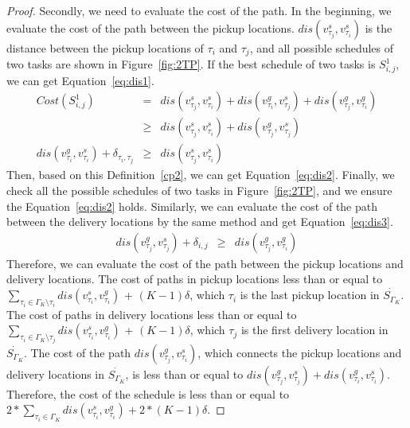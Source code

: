 \documentclass[sigconf,anonymous]{aamas}
\begin{document}
\begin{proof}
    Secondly, we need to evaluate the cost of the path.
    In the beginning, we evaluate the cost of the path between the pickup locations.
    $dis(v^{s}_{\tau_{j}}, v^{s}_{\tau_{i}})$ is the distance 
    between the pickup locations of $\tau_{i}$ and $\tau_{j}$,
    and all possible schedules of two tasks are shown in Figure~\ref{fig:2TP}.
    If the best schedule of two tasks is $S^{1}_{i,j}$,
    we can get Equation~\ref{eq:dis1}.
    \begin{eqnarray}
      \label{eq:dis1}
      Cost(S^{1}_{i,j}) &=& dis(v^s_{\tau_j}, v^s_{\tau_i})+dis(v^g_{\tau_i}, v^s_{\tau_j})
      +dis(v^g_{\tau_j}, v^g_{\tau_i}) \nonumber \\
      & \geq & dis(v^s_{\tau_j}, v^s_{\tau_i})+ dis(v^g_{\tau_j}, v^s_{\tau_j})\\
      \label{eq:dis2}
      dis(v^g_{\tau_i}, v^s_{\tau_i})+\delta_{\tau_i, \tau_j} &\geq& dis(v^s_{\tau_j}, v^s_{\tau_i})
    \end{eqnarray}
    Then, based on this Definition~\ref{cp2}, we can get Equation~\ref{eq:dis2}.
    Finally, we check all the possible schedules of two tasks in Figure~\ref{fig:2TP},
    and we ensure the Equation~\ref{eq:dis2} holds.
    Similarly, we can evaluate the cost of the path between the delivery locations
    by the same method and get Equation~\ref{eq:dis3}.
    \begin{eqnarray}
      \label{eq:dis3}
      dis(v^{g}_{\tau_{j}}, v^{s}_{\tau_{j}})+ \delta_{i,j} &\geq& dis(v^{g}_{\tau_{j}}, v^{g}_{\tau_{i}})
    \end{eqnarray}
    Therefore, we can evaluate the cost of the path between the pickup locations and delivery locations.
    The cost of paths in pickup locations less than or equal to 
    $\sum_{\tau_i \in {\Gamma_K \setminus \tau_i}}{dis(v^{s}_{\tau_i}, v^{g}_{\tau_i})}$ + $(K-1)\delta$,
    which $\tau_i$ is the last pickup location in $\dot{S_{\Gamma_K}}$.
    The cost of paths in delivery locations less than or equal to
    $\sum_{\tau_i \in \Gamma_K \setminus \tau_j}{dis(v^{s}_{\tau_i}, v^{g}_{\tau_i})}$ + $(K-1)\delta$,
    which $\tau_j$ is the first delivery location in $\dot{S_{\Gamma_K}}$.
    The cost of the path $dis(v^{g}_{\tau_{j}}, v^{s}_{\tau_{i}})$, 
    which connects the pickup locations and delivery locations in $\dot{S_{\Gamma_K}}$,
    is less than or equal to $dis(v^{g}_{\tau_{j}}, v^{s}_{\tau_{j}}) + dis(v^{g}_{\tau_{i}}, v^{s}_{\tau_{i}})$.
    Therefore, the cost of the schedule is less than or equal to 
    $2 {\ast} \sum_{\tau_i \in \Gamma_K}{dis(v^{s}_{\tau_i}, v^{g}_{\tau_i})} + 2{\ast}(K-1)\delta$.

\end{proof}
\end{document}
